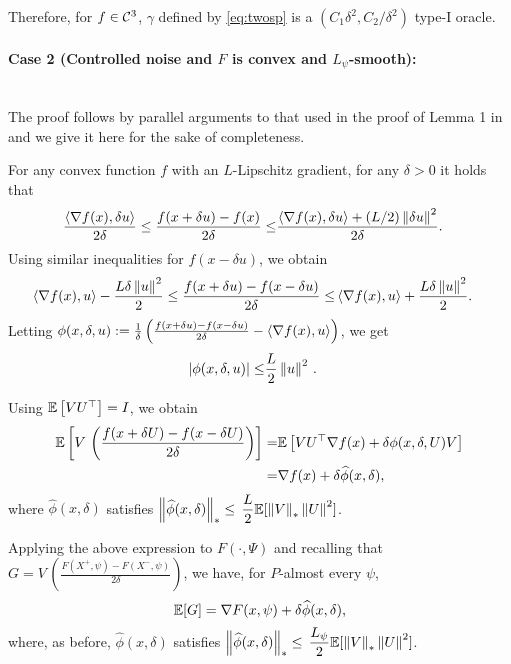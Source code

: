 Therefore, for $f \in \mathcal{C}^3$, $\gamma$ defined by \eqref{eq:twosp} is a $(C_1\delta^2, C_2/\delta^2)$ type-I oracle.

\paragraph{Case 2 (Controlled noise and $F$ is convex and $L_{\psi}$-smooth):}\ \\
The proof follows by parallel arguments to that used in the proof of Lemma 1 in \cite{duchi2015optimal} and we give it here for the sake of completeness.

For any convex function $f$ with an $L$-Lipschitz gradient, for any $\delta>0$ it holds that
\begin{align*}
\frac{\left\langle\nabla f(x), \delta u\right\rangle}{2\delta} \le \frac{f(x + \delta u) -  f(x)}{2\delta} \le& \frac{\left\langle\nabla f(x), \delta u\right\rangle + (L / 2) \left\|\delta u\right\|^2}{2\delta}.
\end{align*}
Using similar inequalities for $f(x-\delta u)$, we obtain
\begin{align*}
\left\langle\nabla f(x), u\right\rangle - \frac{L \delta \left\| u\right\|^2}{2} \le \frac{f(x + \delta u) -  f(x-\delta u)}{2\delta} \le& \left\langle\nabla f(x), u\right\rangle + \frac{L \delta \left\| u\right\|^2}{2}.
\end{align*}
Letting
$\phi(x,\delta,u):=\frac1{\delta}\left(\frac{f(x + \delta u) -  f(x-\delta u)}{2\delta} - \left\langle\nabla f(x),  u\right\rangle\right)$, we get
\begin{align*}
\left|\phi(x,\delta,u) \right| \le&  \dfrac{L}{2} \left\|u\right\|^2\,.
\end{align*}

Using $\mathbb{E}\left[V U^\top\right]=I$, we obtain
\begin{align*}
\mathbb{E}\left[V\,  \left(\frac{f(x+\delta U)  -f(x-\delta U)}{2\delta}\right)\right]=&
\mathbb{E}\left[ V U^\top\nabla f(x) +  \delta\phi(x,\delta,U) V \right]\\
= &  \nabla f(x) + \delta \widehat\phi(x,\delta),
\end{align*}
where $\widehat\phi(x,\delta)$ satisfies $\left\|\widehat\phi(x,\delta)\right\|_*  \le \, \dfrac{L}{2}\mathbb{E}[ \left\|V\right\|_* \left\|U\right\|^2]$.

Applying the above expression to $F(\cdot, \Psi)$ and recalling that $G=V\,  \left(\tfrac{F(X^+,\psi)  -F(X^-,\psi)}{2\delta}\right)$, we have, for $P$-almost every $\psi$, 
$$\mathbb{E}[G] = \nabla F(x,\psi) + \delta \widehat\phi(x,\delta),$$
where, as before, $\widehat\phi(x,\delta)$ satisfies $\left\|\widehat\phi(x,\delta)\right\|_*  \le \, \dfrac{L_{\psi}}{2}\mathbb{E}[ \left\|V\right\|_* \left\|U\right\|^2]$.

